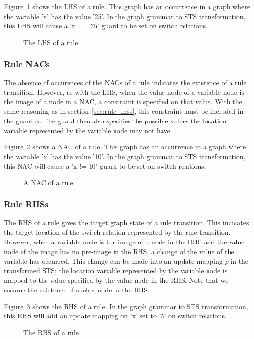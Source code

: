 Figure~\ref{fig:lhs_trafo} shows the LHS of a rule. This graph has an occurrence in a graph where the variable 'x' has the value '25'. In the graph grammar to STS transformation, this LHS will cause a 'x == 25' guard to be set on switch relations.

\begin{figure}[ht]
  \begin{center}
    
  \end{center}
  \caption{The LHS of a rule}
  \label{fig:lhs_trafo}
\end{figure}

\subsubsection{Rule NACs}
The absence of occurences of the NACs of a rule indicates the existence of a rule transition. However, as with the LHS, when the value node of a variable node is the image of a node in a NAC, a constraint is specified on that value. With the same reasoning as in section~\ref{sec:rule_lhss}, this constraint must be included in the guard $\phi$. The guard then also specifies the possible values the location variable represented by the variable node may not have.

Figure~\ref{fig:nac_trafo} shows a NAC of a rule. This graph has an occurrence in a graph where the variable 'x' has the value '10'. In the graph grammar to STS transformation, this NAC will cause a 'x != 10' guard to be set on switch relations.

\begin{figure}[ht]
  \begin{center}
    
  \end{center}
  \caption{A NAC of a rule}
  \label{fig:nac_trafo}
\end{figure}

\subsubsection{Rule RHSs}
The RHS of a rule gives the target graph state of a rule transition. This indicates the target location of the switch relation represented by the rule transition. However, when a variable node is the image of a node in the RHS and the value node of the image has no pre-image in the RHS, a change of the value of the variable has occurred. This change can be made into an update mapping $\rho$ in the transformed STS; the location variable represented by the variable node is mapped to the value specified by the value node in the RHS. Note that we assume the existence of such a node in the RHS.

Figure~\ref{fig:rhs_trafo} shows the RHS of a rule. In the graph grammar to STS transformation, this RHS will add an update mapping on 'x' set to '5' on switch relations.

\begin{figure}[ht]
  \begin{center}
    
  \end{center}
  \caption{The RHS of a rule}
  \label{fig:rhs_trafo}
\end{figure}
